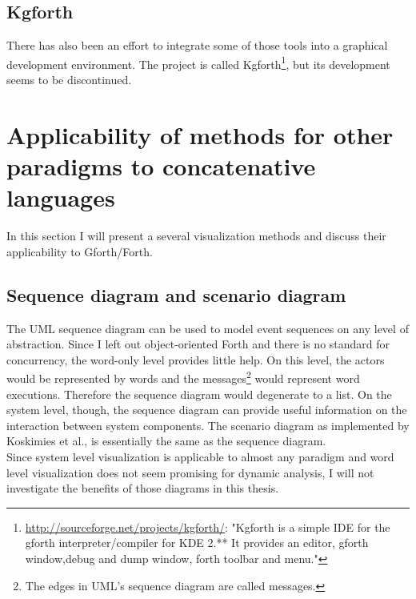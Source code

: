 \subsection*{Kgforth}

There has also been an effort to integrate some of those tools into a graphical development environment. The project is called Kgforth\footnote{\url{http://sourceforge.net/projects/kgforth/}: "Kgforth is a simple IDE for the gforth interpreter/compiler for KDE 2.** 
It provides an editor, gforth window,debug and dump window, forth toolbar and menu."}, but its development seems to be discontinued.

\section{Applicability of methods for other paradigms to concatenative languages}

In this section I will present a several visualization methods and discuss their applicability to Gforth/Forth. 

\subsection*{Sequence diagram and scenario diagram}

The \gls{UML} sequence diagram can be used to model event sequences on any level of abstraction. Since I left out object-oriented Forth and there is no standard for concurrency, the word-only level provides little help. On this level, the actors would be represented by words and the messages\footnote{The edges in UML's sequence diagram are called messages.} would represent word executions. Therefore the sequence diagram would degenerate to a list. On the system level, though, the sequence diagram can provide useful information on the interaction between system components. The scenario diagram as implemented by Koskimies et al.\cite{Koskimies:1996:SUS:871313}, is essentially the same as the sequence diagram.
\\
Since system level visualization is applicable to almost any paradigm and word level visualization does not seem promising for dynamic analysis, I will not investigate the benefits of those diagrams in this thesis.

